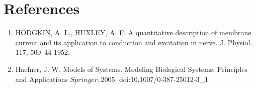 \documentclass[11pt]{article}
\begin{document}



\newpage

\section{References} %
\label{sec:references}

\begin{enumerate}
	\item HODGKIN, A. L., HUXLEY, A. F. A quantitative description of membrane current and its application to conduction and excitation in nerve. J. Physiol. 117, 500–44 \(1952\).
	\item Haefner, J. W. Models of Systems. Modeling Biological Systems: Principles and Applications \(Springer, 2005\). doi:10.1007/0-387-25012-3\_1
\end{enumerate}


\end{document}

